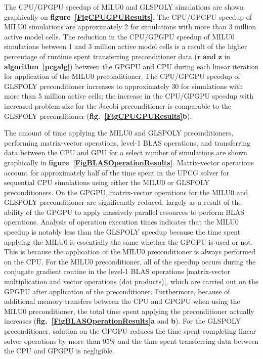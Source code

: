 \documentclass[12pt]{article}
\begin{document}
The CPU/GPGPU speedup of MILU0 and GLSPOLY simulations are shown graphically on \textbf{figure~\ref{FigCPUGPUResults}}. The CPU/GPGPU speedup of MILU0 simulations are approximately 2 for simulations with more than 3 million active model cells. The reduction in the CPU/GPGPU speedup of MILU0 simulations between 1 and 3 million active model cells is a result of the higher percentage of runtime spent transferring preconditioner data ($\mathbf{r \text{ and } z}$ in \textbf{algorithm~\ref{pcgalg}}) between the GPGPU and CPU during each linear iteration for application of the MILU0 preconditioner. The CPU/GPGPU speedup of  GLSPOLY preconditioner increases to approximately 30 for simulations with more than 5 million active cells; the increase in the CPU/GPGPU speedup with increased problem size for the Jacobi preconditioner is comparable to the GLSPOLY preconditioner (\textbf{fig.~\ref{FigCPUGPUResults}b}).

The amount of time applying the MILU0 and GLSPOLY preconditioners, performing matrix-vector operations, level-1 BLAS operations, and transferring data between the CPU and GPU for a select number of simulations are shown graphically in \textbf{figure~\ref{FigBLASOperationResults}}. Matrix-vector operations account for approximately half of the time spent in the UPCG solver for sequential CPU simulations using either the MILU0 or GLSPOLY preconditioners. On the GPGPU, matrix-vector operations for the MILU0 and GLSPOLY preconditioner are significantly reduced, largely as a result of the ability of the GPGPU to apply massively parallel resources to perform BLAS operations.  Analysis of operation execution times indicates that the MILU0 speedup is notably less than the GLSPOLY speedup because the time spent applying the MILU0 is essentially the same whether the GPGPU is used or not.  This is because the application of the MILU0 preconditioner is always performed on the CPU.  For the MILU0 preconditioner, all of the speedup occurs during the conjugate gradient routine in the level-1 BLAS operations [matrix-vector multiplication and vector operations (dot products)], which are carried out on the GPGPU after application of the preconditioner. Furthermore, because of additional memory transfers between the CPU and GPGPU when using the MILU0 preconditioner, the total time spent applying the preconditioner actually increases \color{cyan}(\textbf{fig.~\ref{FigBLASOperationResults}a} and \textbf{b})\color{black}. For the GLSPOLY preconditioner, solution on the GPGPU reduces the time spent completing linear solver operations by more than 95\% and the time spent transferring data between the CPU and GPGPU is negligible.
 
\end{document}
